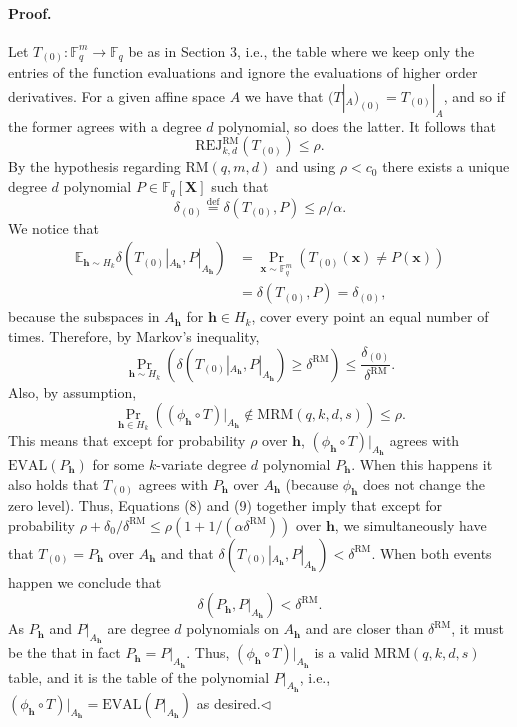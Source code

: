 \documentclass[10pt,a4paper]{article}
\begin{document}
\paragraph{Proof.} Let $T_{(0)}:\mathbb F_q^m\to\mathbb F_q$ be as in Section 3, i.e., the table where we keep only the entries of the function evaluations and ignore the evaluations of higher order derivatives. For a given affine space $A$ we have that $(T|_A)_{(0)}=T_{(0)}|_A$, and so if the former agrees with a degree $d$ polynomial, so does the latter. It follows that
\[\mathrm{REJ}_{k,d}^{\mathrm{RM}}(T_{(0)})\leq\rho.\]
By the hypothesis regarding $\mathrm{RM}(q,m,d)$ and using $\rho<c_0$ there exists a unique degree $d$ polynomial $P\in\mathbb F_q[\boldsymbol X]$ such that
\[\delta_{(0)}\stackrel{\mathrm{def}}=\delta(T_{(0)},P)\leq\rho/\alpha.\]
We notice that
\begin{align*}
\mathbb E_{\boldsymbol h\sim H_k}\delta(T_{(0)}|_{A_{\boldsymbol h}},P|_{A_{\boldsymbol h}})
&=\Pr_{\boldsymbol x\sim\mathbb F_q^m}(T_{(0)}(\boldsymbol x)\neq P(\boldsymbol x))\\
&=\delta(T_{(0)},P)=\delta_{(0)},
\end{align*}
because the subspaces in $A_{\boldsymbol h}$ for $\boldsymbol h\in H_k$, cover every point an equal number of times. Therefore, by Markov's inequality,
\[\Pr_{\boldsymbol h\sim H_k}(\delta(T_{(0)}|_{A_{\boldsymbol h}},P|_{A_{\boldsymbol h}})\geq\delta^{\mathrm{RM}})\leq\frac{\delta_{(0)}}{\delta^{\mathrm{RM}}}.\tag{8}\]
Also, by assumption,
\[\Pr_{\boldsymbol h\in H_k}((\phi_{\boldsymbol h}\circ T)|_{A_{\boldsymbol h}}\notin\mathrm{MRM}(q,k,d,s))\leq\rho.\tag{9}\]
This means that except for probability $\rho$ over $\boldsymbol h$, $(\phi_{\boldsymbol h}\circ T)|_{A_{\boldsymbol h}}$ agrees with $\mathrm{EVAL}(P_{\boldsymbol h})$ for some $k$-variate degree $d$ polynomial $P_{\boldsymbol h}$. When this happens it also holds that $T_{(0)}$ agrees with $P_{\boldsymbol h}$ over $A_{\boldsymbol h}$ (because $\phi_{\boldsymbol h}$ does not change the zero level).
Thus, Equations (8) and (9) together imply that except for probability $\rho+\delta_0/\delta^{\mathrm{RM}}\leq\rho(1+1/(\alpha\delta^{\mathrm{RM}}))$ over $\boldsymbol h$, we simultaneously have that $T_{(0)}=P_{\boldsymbol h}$ over $A_{\boldsymbol h}$ and that $\delta(T_{(0)}|_{A_{\boldsymbol h}},P|_{A_{\boldsymbol h}})<\delta^{\mathrm{RM}}$. When both events happen we conclude that
\[\delta(P_{\boldsymbol h},P|_{A_{\boldsymbol h}})<\delta^{\mathrm{RM}}.\]
As $P_{\boldsymbol h}$ and $P|_{A_{\boldsymbol h}}$ are degree $d$ polynomials on $A_{\boldsymbol h}$ and are closer than $\delta^{\mathrm{RM}}$, it must be the that in fact $P_{\boldsymbol h}=P|_{A_{\boldsymbol h}}$. Thus, $(\phi_{\boldsymbol h}\circ T)|_{A_{\boldsymbol h}}$ is a valid $\mathrm{MRM}(q,k,d,s)$ table, and it is the table of the polynomial $P|_{A_{\boldsymbol h}}$, i.e., $(\phi_{\boldsymbol h}\circ T)|_{A_{\boldsymbol h}}=\mathrm{EVAL}(P|_{A_{\boldsymbol h}})$ as desired.\hfill$\triangleleft$
\end{document}
